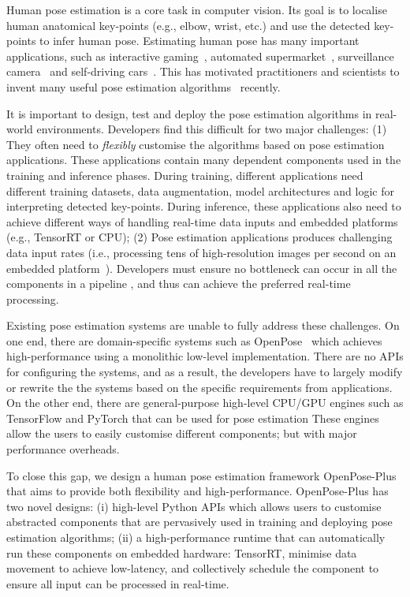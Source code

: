 \documentclass[twoside,11pt]{article}
\begin{document}
Human pose estimation is a core task in computer vision.
Its goal is to localise human anatomical key-points (e.g., elbow, wrist, etc.)
and use the detected key-points to infer human pose. 
Estimating human pose has many important applications, such as interactive gaming~\citep{x}, automated supermarket~\citep{x},
surveillance camera~\citep{x} and self-driving cars~\citep{x}.
This has motivated practitioners and scientists to invent 
many useful pose estimation algorithms~\citep{x1, x2, x3, x4, x5}
recently.

It is important to design, test and deploy the
pose estimation algorithms in real-world environments. 
Developers find this difficult for two major challenges: (1)
They often need to \emph{flexibly} customise the algorithms
based on pose estimation
applications. These applications contain many dependent components 
used in the
training and inference phases. During training,
different applications need different training
datasets, data augmentation, model architectures
and logic for interpreting detected key-points.
During inference, these applications
also need to achieve different ways of handling real-time data inputs and
embedded platforms (e.g., TensorRT or CPU); (2) Pose estimation
applications produces challenging data input rates (i.e., processing tens of high-resolution images per second on an embedded platform~\citep{x}). Developers
must ensure no bottleneck can occur in all the components in a pipeline
, and thus can achieve the preferred real-time processing. 

Existing pose estimation systems are unable to fully address
these challenges.
On one end, there are domain-specific systems such as OpenPose~\citep{x} which achieves high-performance using 
a monolithic low-level implementation.
There are no APIs for configuring the systems, and
as a result, the developers have to largely modify or rewrite the
the systems based on the specific requirements from applications. 
On the other end,
there are general-purpose high-level
CPU/GPU engines such as TensorFlow and PyTorch that can be used
for pose estimation 
These engines allow the users to easily customise different components;
but with major performance overheads. 

To close this gap, we design a human pose estimation framework OpenPose-Plus that
aims to provide both flexibility and high-performance. OpenPose-Plus has two novel designs:
(i) high-level Python APIs which allows users
to customise abstracted components that
are pervasively used in training and deploying
pose estimation algorithms; (ii) a high-performance runtime that
can automatically run these components 
on embedded hardware: TensorRT, minimise
data movement to achieve low-latency,
and collectively schedule the component
to ensure all input can be processed in real-time.
\end{document}
